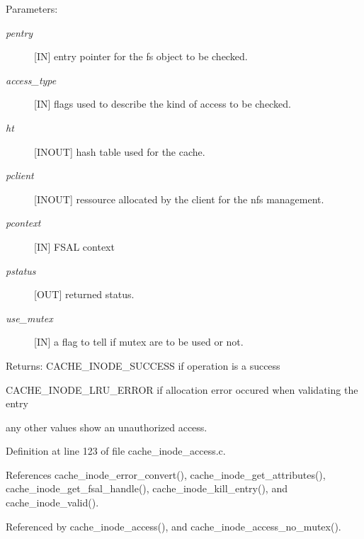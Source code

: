 \begin{Desc}
\item[Parameters:]
\begin{description}
\item[{\em pentry}][IN] entry pointer for the fs object to be checked. \item[{\em access\_\-type}][IN] flags used to describe the kind of access to be checked. \item[{\em ht}][INOUT] hash table used for the cache. \item[{\em pclient}][INOUT] ressource allocated by the client for the nfs management. \item[{\em pcontext}][IN] FSAL context \item[{\em pstatus}][OUT] returned status. \item[{\em use\_\-mutex}][IN] a flag to tell if mutex are to be used or not.\end{description}
\end{Desc}
\begin{Desc}
\item[Returns:]CACHE\_\-INODE\_\-SUCCESS if operation is a success \par
 

CACHE\_\-INODE\_\-LRU\_\-ERROR if allocation error occured when validating the entry \par
 

any other values show an unauthorized access. \end{Desc}


Definition at line 123 of file cache\_\-inode\_\-access.c.

References cache\_\-inode\_\-error\_\-convert(), cache\_\-inode\_\-get\_\-attributes(), cache\_\-inode\_\-get\_\-fsal\_\-handle(), cache\_\-inode\_\-kill\_\-entry(), and cache\_\-inode\_\-valid().

Referenced by cache\_\-inode\_\-access(), and cache\_\-inode\_\-access\_\-no\_\-mutex().
